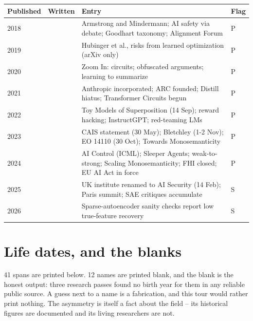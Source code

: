 \par\medskip
\noindent
\begin{tabularx}{\textwidth}{XlXl}
\toprule
Published & Written & Entry & Flag \\
\midrule
2018 &  & Armstrong and Mindermann; AI safety via debate; Goodhart taxonomy; Alignment Forum & P \\
2019 &  & Hubinger et al., risks from learned optimization (arXiv only) & P \\
2020 &  & Zoom In: circuits; obfuscated arguments; learning to summarize & P \\
2021 &  & Anthropic incorporated; ARC founded; Distill hiatus; Transformer Circuits begun & P \\
2022 &  & Toy Models of Superposition (14 Sep); reward hacking; InstructGPT; red-teaming LMs & P \\
2023 &  & CAIS statement (30 May); Bletchley (1-2 Nov); EO 14110 (30 Oct); Towards Monosemanticity & P \\
2024 &  & AI Control (ICML); Sleeper Agents; weak-to-strong; Scaling Monosemanticity; FHI closed; EU AI Act in force & P \\
2025 &  & UK institute renamed to AI Security (14 Feb); Paris summit; SAE critiques accumulate & S \\
2026 &  & Sparse-autoencoder sanity checks report low true-feature recovery & S \\
\bottomrule
\end{tabularx}
\par\medskip

\section*{Life dates, and the blanks}

41 spans are printed below. 12 names are printed blank, and the blank is the honest output: three research passes found no birth year for them in any reliable public source. A guess next to a name is a fabrication, and this tour would rather print nothing. The asymmetry is itself a fact about the field -- its historical figures are documented and its living researchers are not.

\noindent

